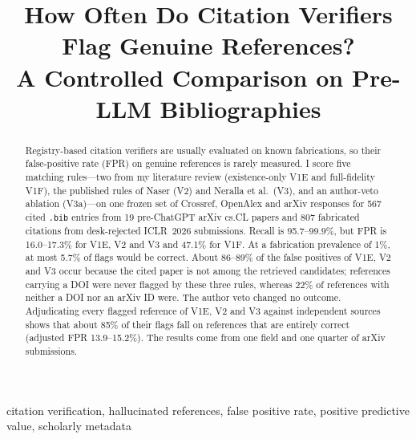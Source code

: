 \documentclass[conference]{IEEEtran}
\begin{document}
\title{How Often Do Citation Verifiers Flag Genuine References?\\
A Controlled Comparison on Pre-LLM Bibliographies}

\author{
}

\maketitle

\begin{abstract}
Registry-based citation verifiers are usually evaluated on known fabrications, so their false-positive
rate (FPR) on genuine references is rarely measured. I score five matching rules---two from my
literature review (existence-only V1E and full-fidelity V1F), the published rules of Naser (V2) and
Neralla et al.\ (V3), and an author-veto ablation (V3a)---on one frozen set of Crossref, OpenAlex and arXiv
responses for 567 cited \texttt{.bib} entries from 19 pre-ChatGPT arXiv cs.CL papers and 807 fabricated
citations from desk-rejected ICLR~2026 submissions. Recall is 95.7--99.9\%, but FPR is 16.0--17.3\% for
V1E, V2 and V3 and 47.1\% for V1F. At a fabrication prevalence of 1\%, at most 5.7\% of flags would be
correct. About 86--89\% of the false positives of V1E, V2 and V3 occur because the cited paper is not
among the retrieved candidates; references carrying a DOI were never flagged by these three rules,
whereas 22\% of references with neither a DOI nor an arXiv ID were. The author veto changed no outcome.
Adjudicating every flagged reference of V1E, V2 and V3 against independent sources shows that about
85\% of their flags fall on references that are entirely correct (adjusted FPR 13.9--15.2\%). The results
come from one field and one quarter of arXiv submissions.
\end{abstract}

\begin{IEEEkeywords}
citation verification, hallucinated references, false positive rate, positive predictive value, scholarly metadata
\end{IEEEkeywords}

\end{document}
